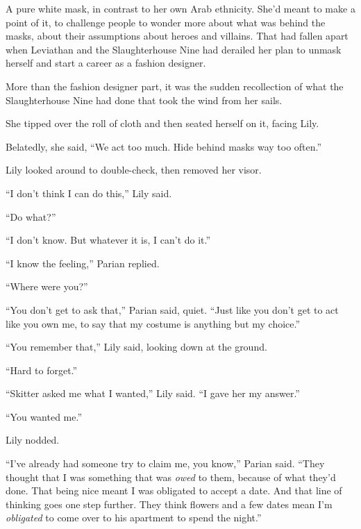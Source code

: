 A pure white mask, in contrast to her own Arab ethnicity.  She'd meant to make a point of it, to challenge people to wonder more about what was behind the masks, about their assumptions about heroes and villains.  That had fallen apart when Leviathan and the Slaughterhouse Nine had derailed her plan to unmask herself and start a career as a fashion designer.



More than the fashion designer part, it was the sudden recollection of what the Slaughterhouse Nine had done that took the wind from her sails.



She tipped over the roll of cloth and then seated herself on it, facing Lily.



Belatedly, she said, ``We act too much.  Hide behind masks way too often.''



Lily looked around to double-check, then removed her visor.



``I don't think I can do this,'' Lily said.



``Do what?''



``I don't know.  But whatever it is, I can't do it.''



``I know the feeling,'' Parian replied.



``Where were you?''



``You don't get to ask that,'' Parian said, quiet.  ``Just like you don't get to act like you own me, to say that my costume is anything but my choice.''



``You remember that,'' Lily said, looking down at the ground.



``Hard to forget.''



``Skitter asked me what I wanted,'' Lily said.  ``I gave her my answer.''



``You wanted me.''



Lily nodded.



``I've already had someone try to claim me, you know,'' Parian said.  ``They thought that I was something that was \emph{owed} to them, because of what they'd done.  That being nice meant I was obligated to accept a date.  And that line of thinking goes one step further.  They think flowers and a few dates mean I'm \emph{obligated} to come over to his apartment to spend the night.''



